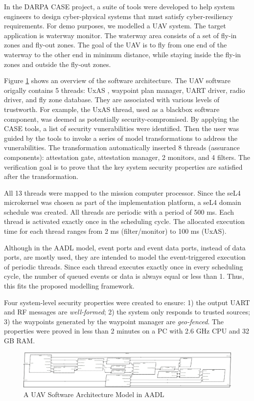 In the DARPA CASE project, a suite of tools were developed to help system engineers to design cyber-physical systems that must satisfy cyber-resiliency requirements.
For demo purposes, we modelled a UAV system. The target application is waterway monitor. The waterway area consists of a set of fly-in zones and fly-out zones. The goal of the UAV is to fly from one end of the waterway to the other end in minimum distance, while staying inside the fly-in zones and outside the fly-out zones.
 
Figure \ref{SW} shows an overview of the software architecture. The UAV software origally contains 5 threads: UxAS \cite{uxas}, waypoint plan manager, UART driver, radio driver, and fly zone database. They are associated with various levels of trustworth. For example, the UxAS thread, used as a blackbox software component, was deemed as potentially security-compromised.
By applying the CASE tools, a list of security vunerabilities were identified. Then the user was guided by the tools to invoke a series of model transformations to address the vunerabilities. The transformation automatically inserted 8 threads (assurance components): attestation gate, attestation manager, 2 monitors, and 4 filters. The verification goal is to prove that the key system security properties are satisfied after the transformation.

All 13 threads were mapped to the mission computer processor. Since the seL4 microkernel was chosen as part of the implementation platform, a seL4 domain schedule was created. All threads are periodic with a period of 500 ms. Each thread is activated exactly once in the scheduling cycle. The allocated execution time for each thread ranges from 2 ms (filter/monitor) to 100 ms (UxAS).

Although in the AADL model, event ports and event data ports, instead of data ports, are mostly used, they are intended to model the event-triggered execution of periodic threads. 
Since each thread executes exactly once in every scheduling cycle, the number of queued events or data is always equal or less than 1. 
Thus, this fits the proposed modelling framework.

Four system-level security properties were created to ensure: 1) the output UART and RF messages are \emph{well-formed}; 2) the system only responds to trusted sources; 3) the waypoints generated by the waypoint manager are \emph{geo-fenced}. The properties were proved in less than 2 minutes on a PC with 2.6 GHz CPU and 32 GB RAM.

\begin{figure}[ht!]
\centering
\includegraphics[width=130mm]{sw.jpg}
\caption{A UAV Software Architecture Model in AADL \label{SW}}
\end{figure}
